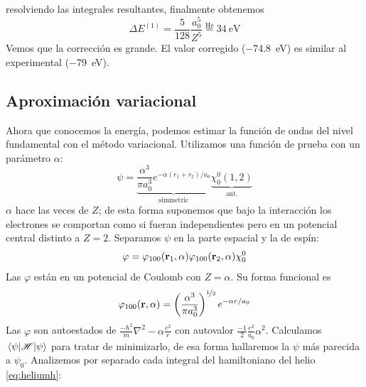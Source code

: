 resolviendo las integrales resultantes, finalmente obtenemos
\begin{equation}
  \Delta E^{(1)} = \frac{5}{128} \frac{a_0^5}{Z^5}
  \stackrel{\text{He}}{=} \SI{34}{\eV}
\end{equation}
Vemos que la corrección es grande. El valor corregido (\SI{-74.8}{\eV})
es similar al experimental (\SI{-79}{\eV}).

\subsection{Aproximación variacional}

Ahora que conocemos la energía, podemos estimar la función de ondas
del nivel fundamental con el método variacional. Utilizamos una
función de prueba con un parámetro $\alpha$:
\begin{equation}
  \psi = \underbrace{\frac{\alpha^3}{\pi a_0^3} e^{-\alpha(r_1+r_2)/a_0}}_{\text{simmetric}} \underbrace{\chi_0^0(1,2)}_{\text{ant.}}
\end{equation}
$\alpha$ hace las veces de $Z$; de esta forma suponemos que bajo la
interacción los electrones se comportan como si fueran independientes
pero en un potencial central distinto a $Z=2$. Separamos $\psi$ en la
parte espacial y la de espín:
\begin{equation}
  \varphi =
  \varphi_{100}(\bm{\mathrm{r}}_1,\alpha)\varphi_{100}(\bm{\mathrm{r}}_2,\alpha) \chi_0^0
\end{equation}
Las $\varphi$ están en un potencial de Coulomb con $Z=\alpha$. Su forma
funcional es
\begin{equation}
  \varphi_{100}(\bm{\mathrm{r}},\alpha) = \left( \frac{\alpha^3}{\pi a_0^3}
  \right)^{{\nicefrac{1}{2}}} e^{-\alpha r /a_0}
\end{equation}
Las $\varphi$ son autoestados de $\frac{-\hbar^2}{m}\nabla^2 -\alpha
\frac{e^2}{r}$ con autovalor $\frac{-1}{2}\frac{e^2}{a_0}\alpha^2$.
Calculamos $\ev{ \Ham }{\psi}$ para tratar de minimizarlo, de esa
forma hallaremos la $\psi$ más parecida a $\psi_0$. Analizemos por
separado cada integral del hamiltoniano del helio \eqref{eq:heliumh}:
